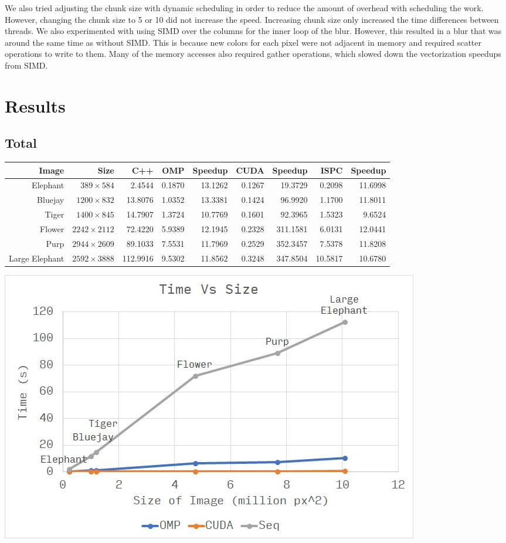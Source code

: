 \documentclass[12pt]{article}
\begin{document}
We also tried adjusting the chunk size with dynamic scheduling in order to
reduce the amount of overhead with scheduling the work. However, changing the
chunk size to 5 or 10 did not increase the speed. Increasing chunk size only
increased the time differences between threads. We also experimented with using
SIMD over the columns for the inner loop of the blur. However, this resulted in
a blur that was around the same time as without SIMD. This is because new
colors for each pixel were not adjacent in memory and required scatter
operations to write to them. Many of the memory accesses also required gather
operations, which slowed down the vectorization speedups from SIMD.

\section{Results}

\subsection{Total}
\begin{tabular}{r|r|r|r|r|r|r|r|r}
    Image & Size & C++ & OMP & Speedup & CUDA & Speedup & ISPC & Speedup
\\  \hline
    Elephant & $389 \times 584$ & 2.4544 & 0.1870 & 13.1262 & 0.1267 & 19.3729 & 0.2098 & 11.6998
\\  Bluejay & $1200 \times 832$ & 13.8076 & 1.0352 & 13.3381 & 0.1424 & 96.9920 & 1.1700 & 11.8011
\\  Tiger & $1400 \times 845$ & 14.7907 & 1.3724 & 10.7769 & 0.1601 & 92.3965 & 1.5323 & 9.6524
\\  Flower & $2242 \times 2112$ & 72.4220 & 5.9389 & 12.1945 & 0.2328 & 311.1581 & 6.0131 & 12.0441
\\  Purp & $2944 \times 2609$ & 89.1033 & 7.5531 & 11.7969 & 0.2529 & 352.3457 & 7.5378 & 11.8208
\\  Large Elephant & $2592 \times 3888$ & 112.9916 & 9.5302 & 11.8562 & 0.3248 & 347.8504 & 10.5817 & 10.6780
\end{tabular}

\begin{center}
\includegraphics[scale=1]{time.jpg}
\end{center}
\end{document}
